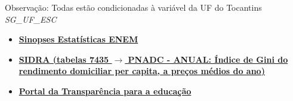 \documentclass[tcc1,project]{uftex}
\begin{document}
Observação: Todas estão condicionadas à variável da UF do Tocantins \textit{SG\_UF\_ESC}

\begin{itemize}

\item \textbf{\href{https://www.gov.br/inep/pt-br/acesso-a-informacao/dados-abertos/sinopses}{Sinopses Estatísticas ENEM}}

\item \textbf{\href{https://sidra.ibge.gov.br/pesquisa/pnadca/tabelas}{SIDRA (tabelas 7435 $\rightarrow$ PNADC - ANUAL: Índice de Gini do rendimento domiciliar per capita, a preços médios do ano)}}

\item \textbf{\href{https://portaldatransparencia.gov.br/funcoes/12-educacao?ano=2024}{Portal da Transparência para a educação}}

\end{itemize}





\appendix
\onehalfspacing	
\end{document}
